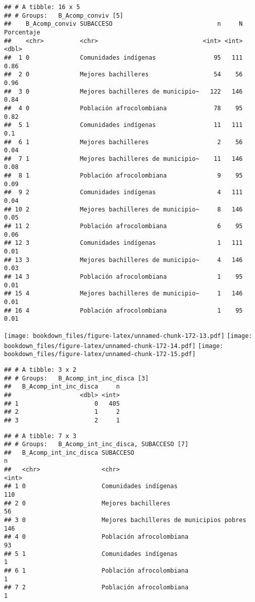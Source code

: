 \documentclass[]{article}
\theoremstyle{definition}
\theoremstyle{definition}
\theoremstyle{definition}
\theoremstyle{remark}
\begin{document}
\begin{verbatim}
## # A tibble: 16 x 5
## # Groups:   B_Acomp_conviv [5]
##    B_Acomp_conviv SUBACCESO                             n     N Porcentaje
##    <chr>          <chr>                             <int> <int>      <dbl>
##  1 0              Comunidades indígenas                95   111       0.86
##  2 0              Mejores bachilleres                  54    56       0.96
##  3 0              Mejores bachilleres de municipio~   122   146       0.84
##  4 0              Población afrocolombiana             78    95       0.82
##  5 1              Comunidades indígenas                11   111       0.1 
##  6 1              Mejores bachilleres                   2    56       0.04
##  7 1              Mejores bachilleres de municipio~    11   146       0.08
##  8 1              Población afrocolombiana              9    95       0.09
##  9 2              Comunidades indígenas                 4   111       0.04
## 10 2              Mejores bachilleres de municipio~     8   146       0.05
## 11 2              Población afrocolombiana              6    95       0.06
## 12 3              Comunidades indígenas                 1   111       0.01
## 13 3              Mejores bachilleres de municipio~     4   146       0.03
## 14 3              Población afrocolombiana              1    95       0.01
## 15 4              Mejores bachilleres de municipio~     1   146       0.01
## 16 4              Población afrocolombiana              1    95       0.01
\end{verbatim}

\texttt{[image: bookdown\_files/figure-latex/unnamed-chunk-172-13.pdf]}
\texttt{[image: bookdown\_files/figure-latex/unnamed-chunk-172-14.pdf]}
\texttt{[image: bookdown\_files/figure-latex/unnamed-chunk-172-15.pdf]}

\begin{verbatim}
## # A tibble: 3 x 2
## # Groups:   B_Acomp_int_inc_disca [3]
##   B_Acomp_int_inc_disca     n
##                   <dbl> <int>
## 1                     0   405
## 2                     1     2
## 3                     2     1
\end{verbatim}

\begin{verbatim}
## # A tibble: 7 x 3
## # Groups:   B_Acomp_int_inc_disca, SUBACCESO [7]
##   B_Acomp_int_inc_disca SUBACCESO                                    n
##   <chr>                 <chr>                                    <int>
## 1 0                     Comunidades indígenas                      110
## 2 0                     Mejores bachilleres                         56
## 3 0                     Mejores bachilleres de municipios pobres   146
## 4 0                     Población afrocolombiana                    93
## 5 1                     Comunidades indígenas                        1
## 6 1                     Población afrocolombiana                     1
## 7 2                     Población afrocolombiana                     1
\end{verbatim}
\end{document}
